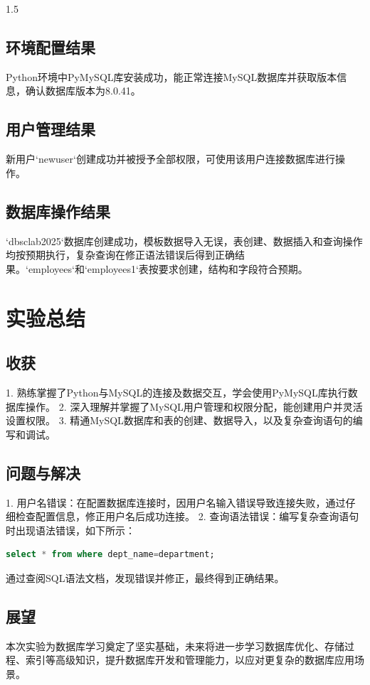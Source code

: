 \documentclass[a4paper,12pt]{report}
\begin{document}
\begin{spacing}{1.5}
\section{环境配置结果}
Python环境中PyMySQL库安装成功，能正常连接MySQL数据库并获取版本信息，确认数据库版本为8.0.41。

\section{用户管理结果}
新用户`newuser`创建成功并被授予全部权限，可使用该用户连接数据库进行操作。

\section{数据库操作结果}
`dbsclab2025`数据库创建成功，模板数据导入无误，表创建、数据插入和查询操作均按预期执行，复杂查询在修正语法错误后得到正确结果。`employees`和`employees1`表按要求创建，结构和字段符合预期。

\chapter{实验总结}
\section{收获}
1. 熟练掌握了Python与MySQL的连接及数据交互，学会使用PyMySQL库执行数据库操作。
2. 深入理解并掌握了MySQL用户管理和权限分配，能创建用户并灵活设置权限。
3. 精通MySQL数据库和表的创建、数据导入，以及复杂查询语句的编写和调试。

\section{问题与解决}
1. 用户名错误：在配置数据库连接时，因用户名输入错误导致连接失败，通过仔细检查配置信息，修正用户名后成功连接。
2. 查询语法错误：编写复杂查询语句时出现语法错误，如下所示：
\begin{lstlisting}[language=SQL]
select * from where dept_name=department;
\end{lstlisting}
通过查阅SQL语法文档，发现错误并修正，最终得到正确结果。

\section{展望}
本次实验为数据库学习奠定了坚实基础，未来将进一步学习数据库优化、存储过程、索引等高级知识，提升数据库开发和管理能力，以应对更复杂的数据库应用场景。

\end{spacing}
\end{document}
